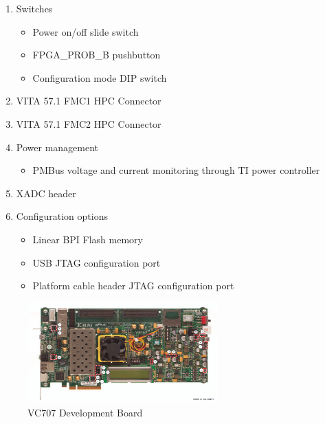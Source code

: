 \begin{enumerate}
  \item Switches

  \begin{itemize}
    \item Power on/off slide switch
    \item FPGA\_PROB\_B pushbutton
    \item Configuration mode DIP switch
  \end{itemize}

  \item VITA 57.1 FMC1 HPC Connector
  \item VITA 57.1 FMC2 HPC Connector
  \item Power management

  \begin{itemize}
    \item PMBus voltage and current monitoring through TI power controller
  \end{itemize}

  \item XADC header
  \item Configuration options

  \begin{itemize}
    \item Linear BPI Flash memory
    \item USB JTAG configuration port
    \item Platform cable header JTAG configuration port
  \end{itemize}

\end{enumerate}

\begin{figure}[htbp]
    \centering
    \includegraphics[width=0.65\textwidth]{./figures/vc707}
    \caption{ VC707 Development Board
    \label{fig:vc707}}
\end{figure}

